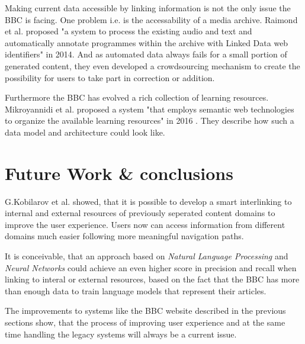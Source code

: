 \documentclass{llncs}
\begin{document}
Making current data accessible by linking information is not the only issue the BBC is facing. One problem i.e. is the accessability of a media archive. Raimond et al. proposed "a system to process the existing audio and text and automatically annotate programmes within the archive with Linked Data web identifiers" \cite{raimond} in 2014. And as automated data always fails for a small portion of generated content, they even developed a crowdsourcing mechanism to create the possibility for users to take part in correction or addition.

Furthermore the BBC has evolved a rich collection of learning resources. Mikroyannidi et al. proposed a system "that employs semantic web technologies to organize the available learning resources" in 2016 \cite{education}. They describe how such a data model and architecture could look like.

\section{Future Work \& conclusions}

G.Kobilarov et al. \cite{mmsw} showed, that it is possible to develop a smart interlinking to internal and external resources of previously seperated content domains to improve the user experience. Users now can access information from different domains much easier following more meaningful navigation paths.

It is conceivable, that an approach based on \textit{Natural Language Processing} and \textit{Neural Networks} could achieve an even higher score in precision and recall when linking to interal or external resources, based on the fact that the BBC has more than enough data to train language models that represent their articles.

The improvements to systems like the BBC website described in the previous sections show, that the process of improving user experience and at the same time handling the legacy systems will always be a current issue.


\vspace{20mm}
\end{document}
